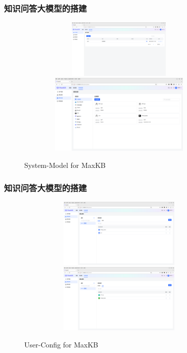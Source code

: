 \begin{frame}
	\frametitle{知识问答大模型的搭建}	
\begin{figure}[h!]
\centering
\vskip -8pt
\includegraphics[height=1.10in,width=3.90in,viewport=0 550 1850 1054,clip]{Figures/MaxKB_user.png}
\includegraphics[height=1.50in,width=3.90in,viewport=0 300 1850 1054,clip]{Figures/MaxKB_System-Model.png}
\caption{\tiny\textrm{System-Model for MaxKB}}%
\label{Fig:MaxKB_System-Model}
\end{figure}
\end{frame}

\begin{frame}
	\frametitle{知识问答大模型的搭建}	
\begin{figure}[h!]
\centering
\vskip -8pt
\includegraphics[height=1.30in,width=3.90in,viewport=0 400 1850 1054,clip]{Figures/MaxKB_user-Data.png}
\includegraphics[height=1.30in,width=3.90in,viewport=0 400 1850 1054,clip]{Figures/MaxKB_user-App.png}
\caption{\tiny\textrm{User-Config for MaxKB}}%
\label{Fig:MaxKB_User-App}
\end{figure}
\end{frame}

